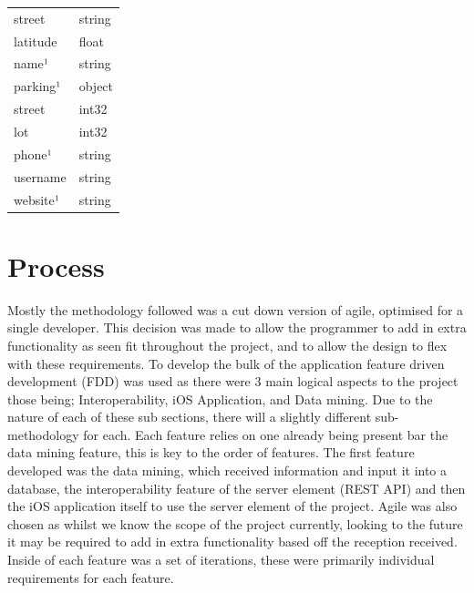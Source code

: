 \begin{table}[h]
\begin{minipage}{.5\linewidth}
\begin{tabular}{|l|l|}
					    street                          & string                                          \\
					    latitude                        & float                                           \\
					    name¹                           & string                                          \\
					    parking¹                        & object                                          \\
					    street                          & int32                                           \\
					    lot                             & int32                                           \\
					    phone¹                          & string                                          \\
					    username                        & string                                          \\
					    website¹                        & string                                          \\
					    \hline
					    \end{tabular}
				\end{minipage} 
				\label{fig:facebookEventVenues}
		\end{table}

\section{Process}
	
	Mostly the methodology followed was a cut down version of agile, optimised for a single developer. This decision was made to allow the programmer to add in extra functionality as seen fit throughout the project, and to allow the design to flex with these requirements. To develop the bulk of the application feature driven development (FDD) was used as there were 3 main logical aspects to the project those being; Interoperability, iOS Application, and Data mining. Due to the nature of each of these sub sections, there will a slightly different sub-methodology for each. Each feature relies on one already being present bar the data mining feature, this is key to the order of features. The first feature developed was the data mining, which received information and input it into a database, the interoperability feature of the server element (REST API) and then the iOS application itself to use the server element of the project. Agile was also chosen as whilst we know the scope of the project currently, looking to the future it may be required to add in extra functionality based off the reception received. Inside of each feature was a set of iterations, these were primarily individual requirements for each feature. 

